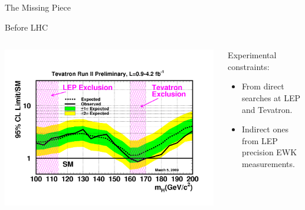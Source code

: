 \begin{frame}{The Missing Piece}

\begin{center}
Before LHC
\begin{columns}
      \begin{column}{0.5\textwidth}
\includegraphics[width=0.99\textwidth]{images/higgs-limits-march2009.png}

\end{column}
\begin{column}{0.5\textwidth}
Experimental constraints:
\begin{itemize}
\item
  From direct searches at LEP and Tevatron.
\item
  Indirect ones from LEP precision EWK measurements.
\end{itemize}
\end{column}
\end{columns}
\end{center}
\end{frame}



